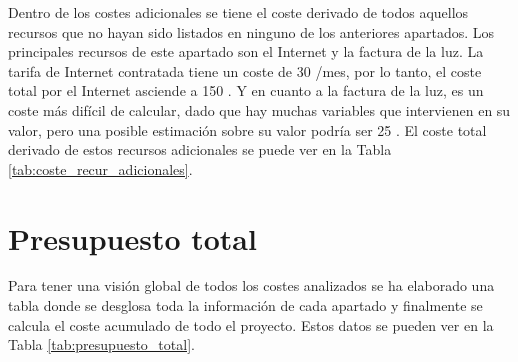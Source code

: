 Dentro de los costes adicionales se tiene el coste derivado de todos aquellos recursos que no hayan sido listados en ninguno de los anteriores apartados. Los principales recursos de este apartado son el Internet y la factura de la luz. La tarifa de Internet contratada tiene un coste de 30 \EURtm/mes, por lo tanto, el coste total por el Internet asciende a 150 \EURtm. Y en cuanto a la factura de la luz, es un coste más difícil de calcular, dado que hay muchas variables que intervienen en su valor, pero una posible estimación sobre su valor podría ser 25 \EURtm. El coste total derivado de estos recursos adicionales se puede ver en la Tabla \ref{tab:coste_recur_adicionales}.

\begin{table}[h]
\centering
{}
\caption{Costes asociados a los recursos adicionales}
\label{tab:coste_recur_adicionales}
\end{table}



\section{Presupuesto total}

Para tener una visión global de todos los costes analizados se ha elaborado una tabla donde se desglosa toda la información de cada apartado y finalmente se calcula el coste acumulado de todo el proyecto. Estos datos se pueden ver en la Tabla \ref{tab:presupuesto_total}.


